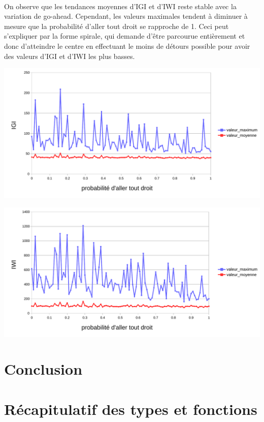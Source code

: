 \documentclass{article}
\begin{document}
    \paragraph{}On observe que les tendances moyennes d'IGI et d'IWI reste stable avec la variation de go-ahead. Cependant, les valeurs maximales tendent à diminuer à mesure que la probabilité d'aller tout droit se rapproche de 1.
    Ceci peut s'expliquer par la forme spirale, qui demande d'être parcourue entièrement et donc d'atteindre le centre en effectuant le moins de détours possible pour avoir des valeurs d'IGI et d'IWI les plus basses.
    \begin{center}
        \includegraphics[width = \textwidth]{graphes pdf/variance go-ahead IGI spirale.pdf}
    \end{center}
    \begin{center}
        \includegraphics[width = \textwidth]{graphes pdf/variance go-ahead IWI spirale.pdf}
    \end{center}
\section{Conclusion}
    \subsection{}

\appendix
\newpage
\section{Récapitulatif des types et fonctions}
\end{document}

